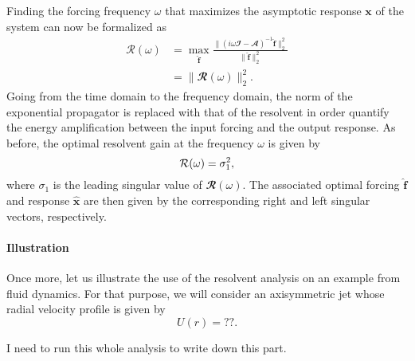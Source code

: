     Finding the forcing frequency $\omega$ that maximizes the asymptotic response $\mathbf{x}$ of the system can now be formalized as
    \begin{equation}
      \begin{aligned}
        \mathcal{R}(\omega) & = \max_{\hat{\mathbf{f}}} \displaystyle \frac{\| \left( i \omega \mathbfcal{I} - \mathbfcal{A} \right)^{-1} \hat{\mathbf{f}} \|_2^2}{\| \hat{\mathbf{f}} \|_2^2} \\
        & = \| \mathbfcal{R}(\omega) \|_2^2.
      \end{aligned}
      \label{eq: theory -- resolvent norm}
    \end{equation}
    Going from the time domain to the frequency domain, the norm of the exponential propagator is replaced with that of the resolvent in order quantify the energy amplification between the input forcing and the output response. As before, the optimal resolvent gain at the frequency $\omega$ is given by
    \begin{equation}
      \mathcal{R}(\omega) = \sigma_1^2,
      \notag
    \end{equation}
    where $\sigma_1$ is the leading singular value of $\mathbfcal{R}(\omega)$. The associated optimal forcing $\hat{\mathbf{f}}$ and response $\hat{\mathbf{x}}$ are then given by the corresponding right and left singular vectors, respectively.

    \paragraph{Illustration}

    Once more, let us illustrate the use of the resolvent analysis on an example from fluid dynamics. For that purpose, we will consider an axisymmetric jet whose radial velocity profile is given by
    \begin{equation}
      U(r) = ??.
      \label{eq: theory -- resolvent analysis - jet profile}
    \end{equation}

    {\color{red} I need to run this whole analysis to write down this part.}
